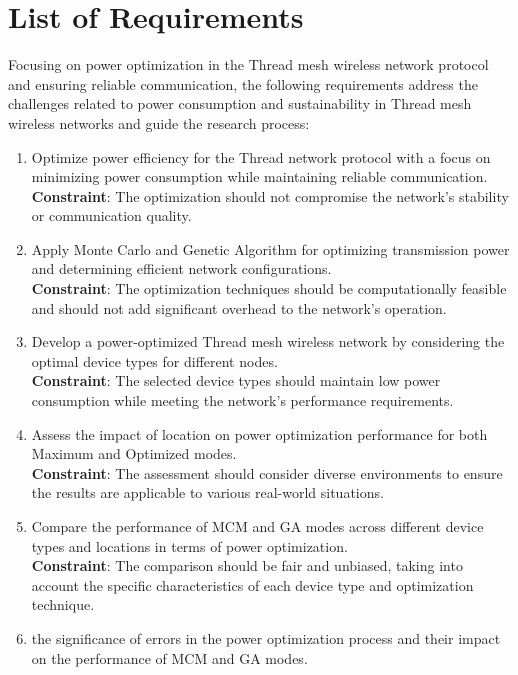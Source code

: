 \section{List of Requirements}\label{sec:list_of_requirements}
Focusing on power optimization in the Thread mesh wireless network protocol and ensuring reliable communication, the following requirements address the challenges related to power consumption and sustainability in Thread mesh wireless networks and guide the research process:

\begin{enumerate}
    \item Optimize power efficiency for the Thread network protocol with a focus on minimizing power consumption while maintaining reliable communication.\\
    \textbf{Constraint}: The optimization should not compromise the network's stability or communication quality.
    \item Apply Monte Carlo and Genetic Algorithm for optimizing transmission power and determining efficient network configurations.\\
    \textbf{Constraint}: The optimization techniques should be computationally feasible and should not add significant overhead to the network's operation.
    \item Develop a power-optimized Thread mesh wireless network by considering the optimal device types for different nodes.\\
    \textbf{Constraint}: The selected device types should maintain low power consumption while meeting the network's performance requirements.
    \item Assess the impact of location on power optimization performance for both Maximum and Optimized modes.\\
    \textbf{Constraint}: The assessment should consider diverse environments to ensure the results are applicable to various real-world situations.
    \item Compare the performance of MCM and GA modes across different device types and locations in terms of power optimization.\\
    \textbf{Constraint}: The comparison should be fair and unbiased, taking into account the specific characteristics of each device type and optimization technique.
    \item the significance of errors in the power optimization process and their impact on the performance of MCM and GA modes.\\

\end{enumerate}
